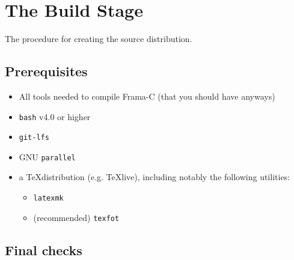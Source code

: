 \chapter{The Build Stage}

The procedure for creating the source distribution.

\section{Prerequisites}

\begin{itemize}
\item All tools needed to compile Frama-C (that you should have anyways)
\item \texttt{bash} v4.0 or higher
\item \texttt{git-lfs}
\item GNU \texttt{parallel}
\item a \TeX distribution (e.g. \TeX{}live),
including notably the following utilities:
\begin{itemize}
\item \texttt{latexmk}
\item (recommended) \texttt{texfot}
\end{itemize}
\end{itemize}

\section{Final checks}

